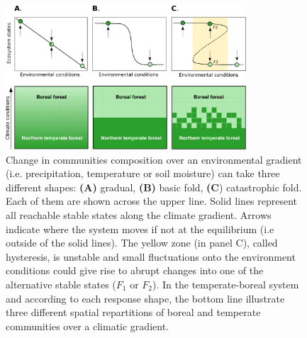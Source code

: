 \begin{figure}[t]
	\begin{center}
	\includegraphics[width=0.8\textwidth]{fig/states.pdf}
	\end{center}
	\caption{Change in communities composition over an environmental gradient (i.e. precipitation, temperature or soil moisture) can take three different shapes: \textbf{(A)} gradual, \textbf{(B)} basic fold,
	\textbf{(C}) catastrophic fold. Each of them are shown across the upper
	line. Solid lines represent all reachable stable states along the climate gradient.  Arrows indicate
	where the system moves if not at the equilibrium (i.e outside of the solid lines). The yellow zone (in panel C),
	called hysteresis, is unstable and small fluctuations onto the environment
	conditions could give rise to abrupt changes into one of the alternative
	stable states ($F_1$ or $F_2$). In the temperate-boreal system and according to each response shape, the bottom line illustrate three different spatial repartitions of boreal and temperate communities over a climatic gradient.}
	\label{fig1}
	\vspace{-1em}
\end{figure}


